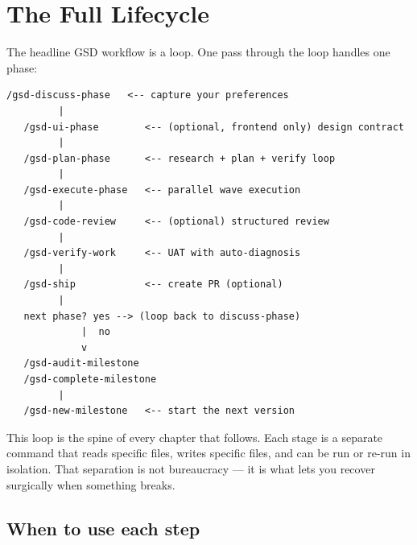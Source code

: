 \documentclass[11pt,letterpaper,openany]{book}
\begin{document}
\chapter{The Full Lifecycle}

The headline GSD workflow is a loop. One pass through the loop handles one phase:

\begin{lstlisting}[style=gsddiagram]
   /gsd-discuss-phase   <-- capture your preferences
         |
   /gsd-ui-phase        <-- (optional, frontend only) design contract
         |
   /gsd-plan-phase      <-- research + plan + verify loop
         |
   /gsd-execute-phase   <-- parallel wave execution
         |
   /gsd-code-review     <-- (optional) structured review
         |
   /gsd-verify-work     <-- UAT with auto-diagnosis
         |
   /gsd-ship            <-- create PR (optional)
         |
   next phase? yes --> (loop back to discuss-phase)
             |  no
             v
   /gsd-audit-milestone
   /gsd-complete-milestone
         |
   /gsd-new-milestone   <-- start the next version
\end{lstlisting}

This loop is the spine of every chapter that follows. Each stage is a separate command that reads specific files, writes specific files, and can be run or re-run in isolation. That separation is not bureaucracy --- it is what lets you recover surgically when something breaks.

\section{When to use each step}
\end{document}
